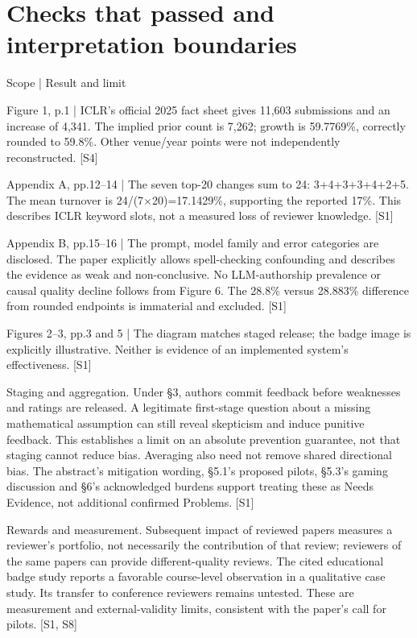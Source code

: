 \documentclass[10pt]{article}
\begin{document}
\section*{Checks that passed and interpretation boundaries}
Scope | Result and limit\par
Figure 1, p.1 | ICLR’s official 2025 fact sheet gives 11,603 submissions and an increase of 4,341. The implied prior count is 7,262; growth is 59.7769\%, correctly rounded to 59.8\%. Other venue/year points were not independently reconstructed. [S4]\par
Appendix A, pp.12–14 | The seven top-20 changes sum to 24: 3+4+3+3+4+2+5. The mean turnover is 24/(7\(\times\)20)=17.1429\%, supporting the reported 17\%. This describes ICLR keyword slots, not a measured loss of reviewer knowledge. [S1]\par
Appendix B, pp.15–16 | The prompt, model family and error categories are disclosed. The paper explicitly allows spell-checking confounding and describes the evidence as weak and non-conclusive. No LLM-authorship prevalence or causal quality decline follows from Figure 6. The 28.8\% versus 28.883\% difference from rounded endpoints is immaterial and excluded. [S1]\par
Figures 2–3, pp.3 and 5 | The diagram matches staged release; the badge image is explicitly illustrative. Neither is evidence of an implemented system’s effectiveness. [S1]\par
Staging and aggregation. Under §3, authors commit feedback before weaknesses and ratings are released. A legitimate first-stage question about a missing mathematical assumption can still reveal skepticism and induce punitive feedback. This establishes a limit on an absolute prevention guarantee, not that staging cannot reduce bias. Averaging also need not remove shared directional bias. The abstract’s mitigation wording, §5.1’s proposed pilots, §5.3’s gaming discussion and §6’s acknowledged burdens support treating these as Needs Evidence, not additional confirmed Problems. [S1]\par
Rewards and measurement. Subsequent impact of reviewed papers measures a reviewer’s portfolio, not necessarily the contribution of that review; reviewers of the same papers can provide different-quality reviews. The cited educational badge study reports a favorable course-level observation in a qualitative case study. Its transfer to conference reviewers remains untested. These are measurement and external-validity limits, consistent with the paper’s call for pilots. [S1, S8]\par
\end{document}
